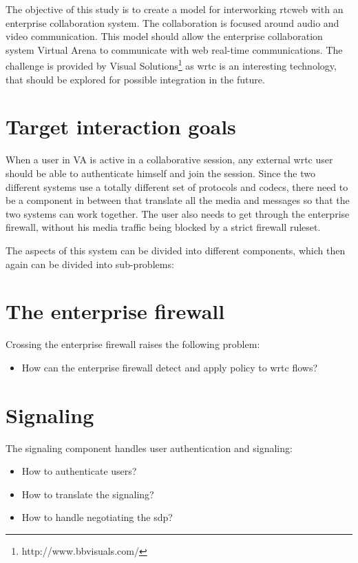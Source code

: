 
The objective of this study is to create a model for interworking \gls{rtcweb} with an enterprise collaboration system. The collaboration is focused around audio and video communication. This model should allow the enterprise collaboration system Virtual Arena to communicate with web real-time communications. The challenge is provided by Visual Solutions\footnote{http://www.bbvisuals.com/} as \gls{wrtc} is an interesting technology, that should be explored for possible integration in the future.

\section{Target interaction goals}
When a user in VA is active in a collaborative session, any external \gls{wrtc} user should be able to authenticate himself and join the session. Since the two different systems use a totally different set of protocols and codecs, there need to be a component in between that translate all the media and messages so that the two systems can work together. The user also needs to get through the enterprise firewall, without his media traffic being blocked by a strict firewall ruleset.

The aspects of this system can be divided into different components, which then again can be divided into sub-problems:

\section{The enterprise firewall}
Crossing the enterprise firewall raises the following problem:
\begin{itemize}
\item{How can the enterprise firewall detect and apply policy to \gls{wrtc} flows?}
\end{itemize}

\section{Signaling}
The signaling component handles user authentication and signaling:
\begin{itemize}
\item{How to authenticate users?}
\item{How to translate the signaling?}
\item{How to handle negotiating the \gls{sdp}?}
\end{itemize}

